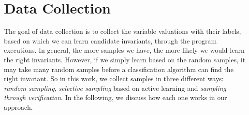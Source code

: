 
\section{Data Collection} %
\label{sec:datacollection}
The goal of data collection is  to collect the variable valuations with their labels, based on which we can learn candidate invariants, through the program executions. 
In general, the more samples we have, the more likely we would learn the right invariants. 
However, if we simply learn based on the random samples, it may take many random samples before a classification algorithm can find the right invariant. 
So in this work, we collect samples in three different ways: \emph{random sampling}, \emph{selective sampling} based on active learning and \emph{sampling through verification}. 
In the following, we discuss how each one works in our approach.


